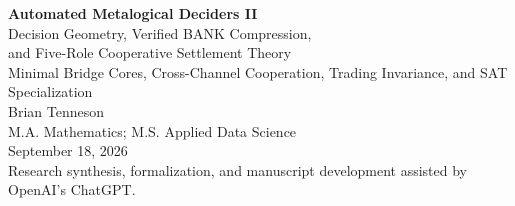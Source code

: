 \documentclass[11pt]{article}
\theoremstyle{remark}
\begin{document}
\begin{center}
{\LARGE\bfseries Automated Metalogical Deciders II}\\[0.35em]
{\Large Decision Geometry, Verified BANK Compression,\\and Five-Role Cooperative Settlement Theory}\\[0.45em]
{\large Minimal Bridge Cores, Cross-Channel Cooperation, Trading Invariance, and SAT Specialization}\\[0.85em]
{\large Brian Tenneson}\\[0.25em]
{\normalsize M.A. Mathematics; M.S. Applied Data Science}\\[0.2em]
{\normalsize September 18, 2026}\\[0.65em]
{\small Research synthesis, formalization, and manuscript development assisted by OpenAI's ChatGPT.}
\end{center}
\end{document}

